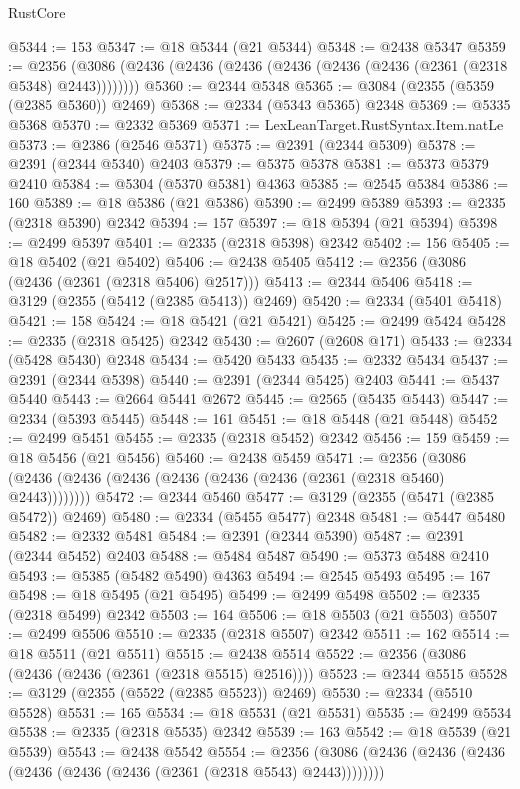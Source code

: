 \begin{lexlean}{RustCore}
\begin{coremodule}
@5344 := 153
@5347 := @18 @5344 (@21 @5344)
@5348 := @2438 @5347
@5359 := @2356 (@3086 (@2436 (@2436 (@2436 (@2436 (@2436 (@2436 (@2361 (@2318 @5348) @2443))))))))
@5360 := @2344 @5348
@5365 := @3084 (@2355 (@5359 (@2385 @5360)) @2469)
@5368 := @2334 (@5343 @5365) @2348
@5369 := @5335 @5368
@5370 := @2332 @5369
@5371 := LexLeanTarget.RustSyntax.Item.natLe
@5373 := @2386 (@2546 @5371)
@5375 := @2391 (@2344 @5309)
@5378 := @2391 (@2344 @5340) @2403
@5379 := @5375 @5378
@5381 := @5373 @5379 @2410
@5384 := @5304 (@5370 @5381) @4363
@5385 := @2545 @5384
@5386 := 160
@5389 := @18 @5386 (@21 @5386)
@5390 := @2499 @5389
@5393 := @2335 (@2318 @5390) @2342
@5394 := 157
@5397 := @18 @5394 (@21 @5394)
@5398 := @2499 @5397
@5401 := @2335 (@2318 @5398) @2342
@5402 := 156
@5405 := @18 @5402 (@21 @5402)
@5406 := @2438 @5405
@5412 := @2356 (@3086 (@2436 (@2361 (@2318 @5406) @2517)))
@5413 := @2344 @5406
@5418 := @3129 (@2355 (@5412 (@2385 @5413)) @2469)
@5420 := @2334 (@5401 @5418)
@5421 := 158
@5424 := @18 @5421 (@21 @5421)
@5425 := @2499 @5424
@5428 := @2335 (@2318 @5425) @2342
@5430 := @2607 (@2608 @171)
@5433 := @2334 (@5428 @5430) @2348
@5434 := @5420 @5433
@5435 := @2332 @5434
@5437 := @2391 (@2344 @5398)
@5440 := @2391 (@2344 @5425) @2403
@5441 := @5437 @5440
@5443 := @2664 @5441 @2672
@5445 := @2565 (@5435 @5443)
@5447 := @2334 (@5393 @5445)
@5448 := 161
@5451 := @18 @5448 (@21 @5448)
@5452 := @2499 @5451
@5455 := @2335 (@2318 @5452) @2342
@5456 := 159
@5459 := @18 @5456 (@21 @5456)
@5460 := @2438 @5459
@5471 := @2356 (@3086 (@2436 (@2436 (@2436 (@2436 (@2436 (@2436 (@2361 (@2318 @5460) @2443))))))))
@5472 := @2344 @5460
@5477 := @3129 (@2355 (@5471 (@2385 @5472)) @2469)
@5480 := @2334 (@5455 @5477) @2348
@5481 := @5447 @5480
@5482 := @2332 @5481
@5484 := @2391 (@2344 @5390)
@5487 := @2391 (@2344 @5452) @2403
@5488 := @5484 @5487
@5490 := @5373 @5488 @2410
@5493 := @5385 (@5482 @5490) @4363
@5494 := @2545 @5493
@5495 := 167
@5498 := @18 @5495 (@21 @5495)
@5499 := @2499 @5498
@5502 := @2335 (@2318 @5499) @2342
@5503 := 164
@5506 := @18 @5503 (@21 @5503)
@5507 := @2499 @5506
@5510 := @2335 (@2318 @5507) @2342
@5511 := 162
@5514 := @18 @5511 (@21 @5511)
@5515 := @2438 @5514
@5522 := @2356 (@3086 (@2436 (@2436 (@2361 (@2318 @5515) @2516))))
@5523 := @2344 @5515
@5528 := @3129 (@2355 (@5522 (@2385 @5523)) @2469)
@5530 := @2334 (@5510 @5528)
@5531 := 165
@5534 := @18 @5531 (@21 @5531)
@5535 := @2499 @5534
@5538 := @2335 (@2318 @5535) @2342
@5539 := 163
@5542 := @18 @5539 (@21 @5539)
@5543 := @2438 @5542
@5554 := @2356 (@3086 (@2436 (@2436 (@2436 (@2436 (@2436 (@2436 (@2361 (@2318 @5543) @2443))))))))

\end{coremodule}
\end{lexlean}
